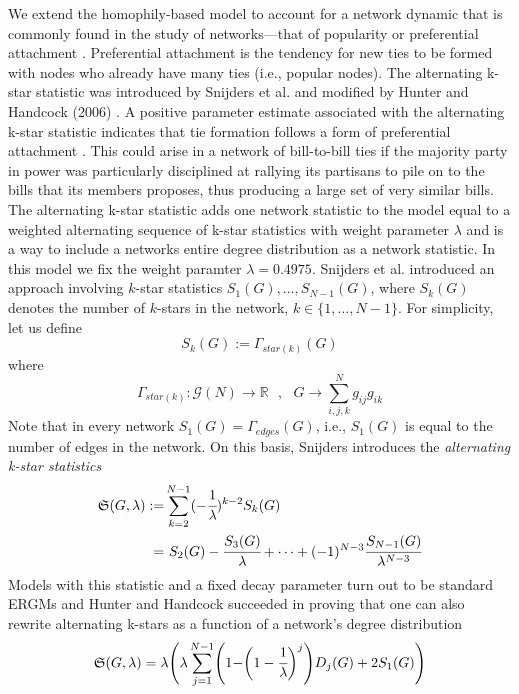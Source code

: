 \documentclass[10pt, conference, compsocconf]{IEEEtran}
\begin{document}
We extend the homophily-based model to account for a network dynamic that is commonly found in the study of networks---that of popularity or preferential attachment \cite{barabasi1999emergence}. Preferential attachment is the tendency for new ties to be formed with nodes who already have many ties (i.e., popular nodes).  The alternating k-star statistic was introduced by Snijders et al. \cite{SnijdersTomA.B..2006} and modified by Hunter and Handcock (2006) \cite{Hunter.2006}. A positive parameter estimate associated with the alternating k-star statistic indicates that tie formation follows a form of preferential attachment \cite{SnijdersTomA.B..2006}. This could arise in a network of bill-to-bill ties if the majority party in power was particularly disciplined at rallying its partisans to pile on to the bills that its members proposes, thus producing a large set of very similar bills. The alternating k-star statistic adds one network statistic to the model equal to a weighted alternating sequence of k-star statistics with weight parameter $\lambda$ and is a way to include a networks entire degree distribution as a network statistic. In this model we fix the weight paramter $\lambda=0.4975$. 
Snijders et al. \cite{SnijdersTomA.B..2006} introduced an approach involving $k$-star statistics $S_1(G), \dots , S_{N-1}(G)$, where $S_k(G)$ denotes the number of $k$-stars in the network, $k \in \{1, \dots , N-1\}$. For simplicity, let us define
$$S_k(G):=\Gamma_{star(k)}(G) $$
where
$$\Gamma_{star(k)}: \mathcal{G}(N) \to \mathbb{R}~~~, ~~~ G \to \sum_{i,j,k}^N g_{ij}g_{ik}$$
Note that in every network $S_1(G)=\Gamma_{edges}(G)$, i.e., $S_1(G)$ is equal to the number of edges in the network.
On this basis, Snijders introduces the \textit{alternating k-star statistics}
\begin{equation*}
\begin{split}
\mathfrak{S}(G,\lambda):= & \sum_{k=2}^{N-1}(-\cfrac{1}{\lambda})^{k-2}S_k(G)\\= & ~   S_2(G)-\cfrac{S_3(G)}{\lambda}+ \dots + (-1)^{N-3}\cfrac{S_{N-1}(G)}{\lambda^{N-3}}
\end{split}
\end{equation*} 
Models with this statistic and a fixed decay parameter turn out to be standard ERGMs and Hunter and Handcock \cite{Hunter.2006} succeeded in proving that one can also rewrite alternating k-stars as a function of a network's degree distribution
\begin{equation}
\mathfrak{S}(G,\lambda)= \lambda\Biggr(\lambda\sum_{j=1}^{N-1}\Biggr( 1-\biggr(1-\cfrac{1}{\lambda}\biggl)^j\Biggl)D_j(G) + 2S_1(G)\Biggl)
\label{alto}
\end{equation}
\end{document}
